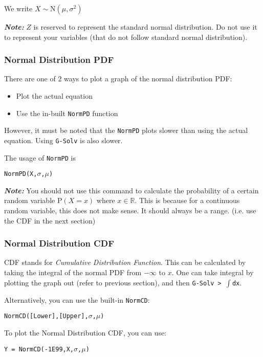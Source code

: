 \documentclass[a5paper,draft]{memoir}
\def\code#1{\texttt{#1}}
\def\note#1{\textbf{\textit{Note:}} #1}
\newcommand{\addtoindex}[1]{#1\index{#1}}
\begin{document}
We write $X \sim \mathrm{N} (\mu,\sigma^2)$

\note{$Z$ is reserved to represent the standard normal distribution. Do not use it to represent your variables (that do not follow standard normal distribution).}

\subsubsection{Normal Distribution PDF}
There are one of 2 ways to plot a graph of the normal distribution PDF:

\begin{itemize}
	\item Plot the actual equation
	\item Use the in-built \code{NormPD} function
\end{itemize}

However, it must be noted that the \code{NormPD} plots slower than using the actual equation. Using \code{G-Solv} is also slower.

The usage of \code{\addtoindex{NormPD}} is 
\begin{center}
	\code{NormPD(X,$\sigma$,$\mu$)}
\end{center}

\note{You should not use this command to calculate the probability of a certain random variable $\textrm{P}(X = x)$ where $x \in \mathbb{R}$. This is because for a continuous random variable, this does not make sense. It should always be a range. (i.e. use the CDF in the next section)}

\subsubsection{Normal Distribution CDF}
CDF stands for \textit{Cumulative Distribution Function}. This can be calculated by taking the integral of the normal PDF from $-\infty$ to $x$. One can take integral by plotting the graph out (refer to previous section), and then \code{G-Solv > $\int$dx}.

Alternatively, you can use the built-in \code{\addtoindex{NormCD}}:
\begin{center}
	\code{NormCD([Lower],[Upper],$\sigma$,$\mu$)}
\end{center}

To plot the Normal Distribution CDF, you can use:
\begin{center}
	\code{Y = NormCD(-1E99,X,$\sigma$,$\mu$)}
\end{center}
\end{document}
